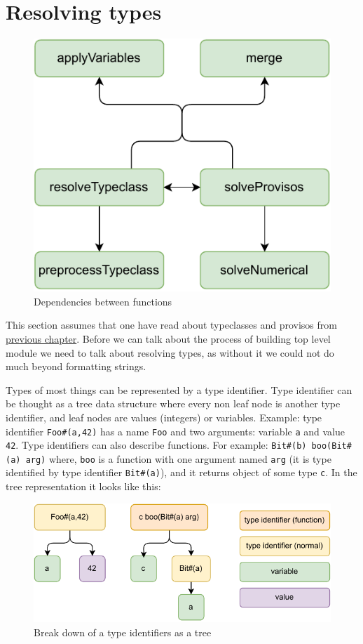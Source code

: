\documentclass[12pt]{report}
\begin{document}
\newpage
\section{Resolving types}
\begin{figure}[!h]
    \centering
    \caption{Dependencies between functions}

    \includegraphics[width=0.5\columnwidth]{pdfExports/LargeMapResolve.pdf}
\end{figure}
This section assumes that one have read about typeclasses and provisos from \hyperref[sec:Typeclasses]{previous chapter}.
Before we can talk about the process of building top level module we need to talk about resolving types, as without it we could not do much beyond formatting strings.
\par
Types of most things can be represented by a type identifier.
Type identifier can be thought as a tree data structure where every non leaf node is another type identifier, and leaf nodes are values (integers) or variables. 
Example: type identifier \verb!Foo#(a,42)! has a name \verb!Foo! and two arguments: variable \verb!a! and value \verb!42!.
Type identifiers can also describe functions.
For example: \verb!Bit#(b) boo(Bit#(a) arg)! where, 
\verb!boo! is a function with one argument named \verb!arg! (it is type identified by type identifier \verb!Bit#(a)!), and it returns object of some type \verb!c!. In the tree representation it looks like this:
\begin{figure}[h]
    \centering
    \caption{Break down of a type identifiers as a tree}
    \includegraphics[width=0.7\columnwidth]{pdfExports/LargeMap-FunctionBreakDown.drawio.pdf}
\end{figure}
\end{document}
